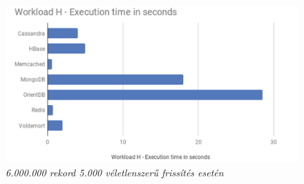 \begin{figure}[H]
	\centering
	\includegraphics[width=0.9\linewidth]{figures/images/performance_c.png}
	\caption[6.000.000 rekord 5.000 véletlenszerű frissítés esetén]{\textit{6.000.000 rekord 5.000 véletlenszerű frissítés esetén}\footnotemark}
	\label{fig:performance_c}
\end{figure}

